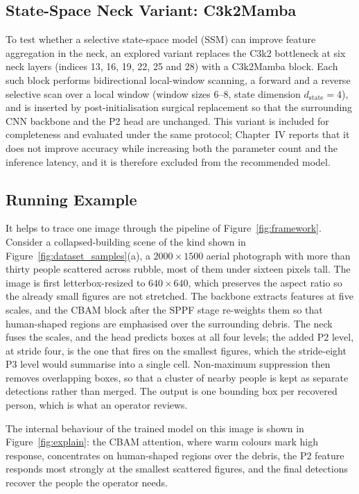 \subsection{State-Space Neck Variant: C3k2Mamba}
\label{sec:mamba}
To test whether a selective state-space model (SSM) can improve feature
aggregation in the neck, an explored variant replaces the C3k2 bottleneck at six
neck layers (indices 13, 16, 19, 22, 25 and 28) with a C3k2Mamba block. Each such
block performs bidirectional local-window scanning, a forward and a reverse
selective scan over a local window (window sizes 6--8, state dimension
$d_{\text{state}} = 4$), and is inserted by post-initialisation surgical
replacement so that the surrounding CNN backbone and the P2 head are unchanged.
This variant is included for completeness and evaluated under the same protocol;
Chapter~IV reports that it does not improve accuracy while increasing both the
parameter count and the inference latency, and it is therefore excluded from the
recommended model.

\subsection{Running Example}
It helps to trace one image through the pipeline of Figure~\ref{fig:framework}.
Consider a collapsed-building scene of the kind shown in
Figure~\ref{fig:dataset_samples}(a), a $2000\times1500$ aerial photograph with more
than thirty people scattered across rubble, most of them under sixteen pixels tall.
The image is first letterbox-resized to $640\times640$, which preserves the aspect
ratio so the already small figures are not stretched. The backbone extracts features
at five scales, and the CBAM block after the SPPF stage re-weights them so that
human-shaped regions are emphasised over the surrounding debris. The neck fuses the
scales, and the head predicts boxes at all four levels; the added P2 level, at
stride four, is the one that fires on the smallest figures, which the stride-eight
P3 level would summarise into a single cell. Non-maximum suppression then removes
overlapping boxes, so that a cluster of nearby people is kept as separate detections
rather than merged. The output is one bounding box per recovered person, which is
what an operator reviews.

The internal behaviour of the trained model on this image is shown in
Figure~\ref{fig:explain}: the CBAM attention, where warm colours mark high
response, concentrates on human-shaped regions over the debris, the P2 feature responds most strongly at the smallest scattered
figures, and the final detections recover the people the operator needs.


